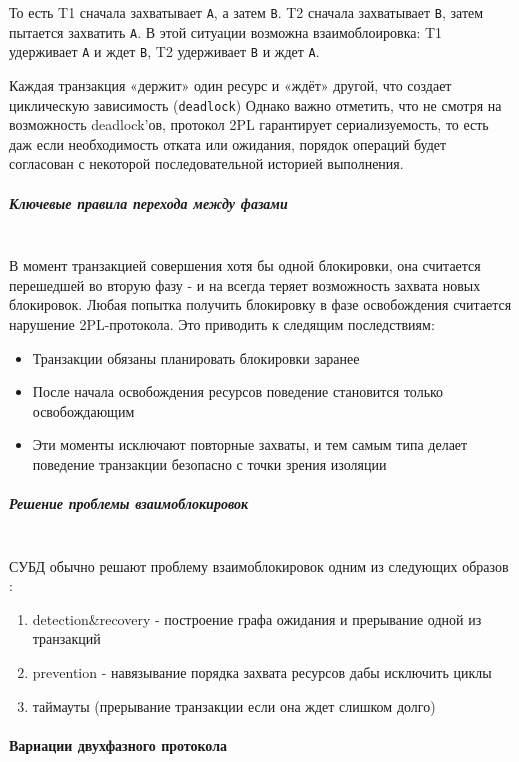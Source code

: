То есть T1 сначала захватывает \texttt{A}, а затем \texttt{B}. T2 сначала захватывает \texttt{B}, затем пытается захватить \texttt{A}.
В этой ситуации возможна взаимоблоировка: T1 удерживает \texttt{A} и ждет \texttt{B}, T2 удерживает \texttt{B} и ждет \texttt{A}.

Каждая транзакция «держит» один ресурс и «ждёт» другой, что создает циклическую зависимость (\texttt{deadlock})
Однако важно отметить, что не смотря на возможность deadlock'ов, протокол 2PL гарантирует сериализуемость, то есть даж если необходимость отката или ожидания, порядок операций будет согласован с некоторой последовательной историей выполнения.

\subparagraph{Ключевые правила перехода между фазами} ~\\
 В момент транзакцией совершения хотя бы одной блокировки, она считается перешедшей во вторую фазу - и на всегда теряет возможность захвата новых блокировок. Любая попытка получить блокировку в фазе освобождения считается нарушение 2PL-протокола.
 Это приводить к следящим последствиям:
 \begin{itemize}
    \item Транзакции обязаны планировать блокировки заранее
    \item После начала освобождения ресурсов поведение становится только освобождающим
    \item Эти моменты исключают повторные захваты, и тем самым типа делает поведение транзакции безопасно с точки зрения изоляции \autocite[ch.22]{ElmasriNavathe}
 \end{itemize}

\subparagraph{Решение проблемы взаимоблокировок} ~\\

 СУБД обычно решают проблему взаимоблокировок одним из следующих образов \autocite{Silberschatz}:
 \begin{enumerate}
    \item detection\&recovery - построение графа ожидания и прерывание одной из транзакций
    \item prevention - навязывание порядка захвата ресурсов дабы исключить циклы
    \item таймауты (прерывание транзакции если она ждет слишком долго)
 \end{enumerate}

 \paragraph{Вариации двухфазного протокола} ~\\

